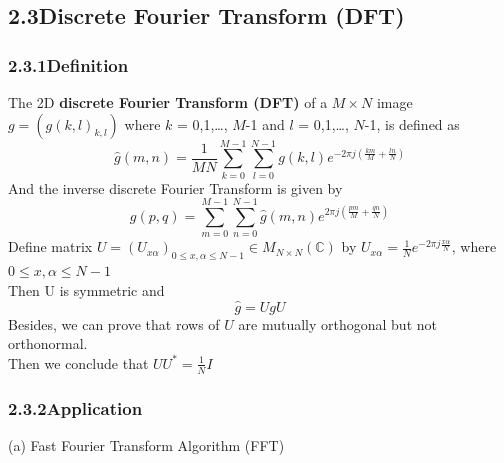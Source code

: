 \documentclass[12pt]{article}
\begin{document}
\subsection*{2.3\quad Discrete Fourier Transform (DFT)}

\subsubsection*{2.3.1\quad Definition}
The 2D \textbf{discrete Fourier Transform (DFT)} of a $M\times N$ image $g = (g(k,l)_{k,l})$ 
where $k$ = 0,1,\ldots, $M$-1 and $l$ = 0,1,\ldots, $N$-1, is defined as 
\begin{equation*}
    \hat{g}(m,n) = \frac{1}{MN}\sum_{k=0}^{M-1}\sum_{l=0}^{N-1}g(k,l)e^{-2\pi j(\frac{km}{M}+\frac{ln}{N})}
\end{equation*}
And the inverse discrete Fourier Transform is given by
\begin{equation*}
    g(p,q) = \sum_{m=0}^{M-1}\sum_{n=0}^{N-1}\hat{g}(m,n)e^{2\pi j(\frac{pm}{M}+\frac{qn}{N})}
\end{equation*}
Define matrix $U=(U_{x\alpha})_{0\leqslant x,\alpha \leqslant N-1}\in M_{N\times N}(\mathbb{C})$
by $U_{x\alpha}=\frac{1}{N} e^{-2\pi j\frac{x\alpha}{N}}$, where $0\leqslant x,\alpha \leqslant N-1$\\
Then U is symmetric and 
\begin{equation*}
    \hat{g} = UgU
\end{equation*}
Besides, we can prove that rows of $U$ are mutually orthogonal but not orthonormal.\\
Then we conclude that $UU^{\ast}=\frac{1}{N}I$

\subsubsection*{2.3.2\quad Application}
(a) Fast Fourier Transform Algorithm (FFT)
\end{document}
